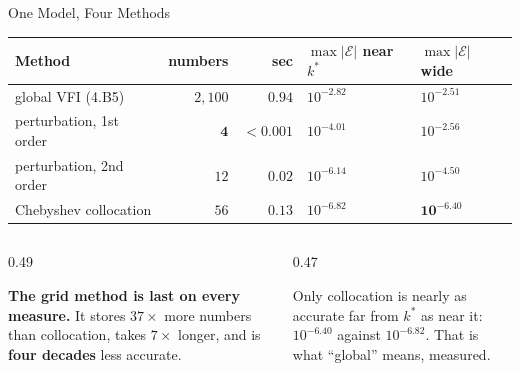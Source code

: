 \begin{frame}{One Model, Four Methods}
\small
\begin{center}
\begin{tabularx}{0.97\linewidth}{@{}>{\raggedright\arraybackslash}p{3.3cm} r r >{\raggedleft\arraybackslash}X >{\raggedleft\arraybackslash}X@{}}
\toprule
\textbf{Method} & \textbf{numbers} & \textbf{sec} & $\max|\mathcal{E}|$ \textbf{near} $k^{*}$ & $\max|\mathcal{E}|$ \textbf{wide} \\
\midrule
global VFI (4.B5) & $2{,}100$ & $0.94$ & $10^{-2.82}$ & $10^{-2.51}$ \\
perturbation, 1st order & $\mathbf{4}$ & $<0.001$ & $10^{-4.01}$ & $10^{-2.56}$ \\
perturbation, 2nd order & $12$ & $0.02$ & $10^{-6.14}$ & $10^{-4.50}$ \\
Chebyshev collocation & $56$ & $0.13$ & $10^{-6.82}$ & $\mathbf{10^{-6.40}}$ \\
\bottomrule
\end{tabularx}
\end{center}
\medskip
\begin{columns}[T]
\begin{column}{0.49\textwidth}
\begin{takeawaybox}\footnotesize
\textbf{The grid method is last on every measure.} It stores $37\times$ more numbers than collocation, takes $7\times$ longer, and is \textbf{four decades} less accurate.
\end{takeawaybox}
\end{column}
\begin{column}{0.47\textwidth}
\begin{conceptbox}[title=\textbf{The flat column}]\footnotesize
Only collocation is nearly as accurate far from $k^{*}$ as near it: $10^{-6.40}$ against $10^{-6.82}$. That is what ``global'' means, measured.
\end{conceptbox}
\end{column}
\end{columns}
\vspace{1mm}
\end{frame}

